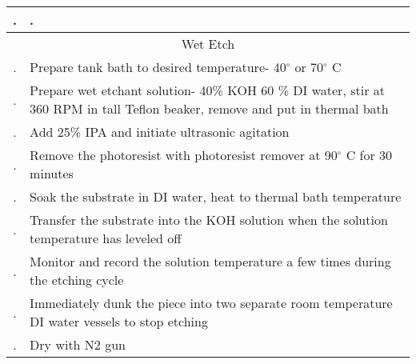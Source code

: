 \begin{longtable}{cp{15cm}}
	\midrule		
.&.\\	
	\midrule
	\multicolumn{2}{c}{Wet Etch} \\
	\midrule		
.&Prepare tank bath to desired temperature-  40$^{\circ}$ or 70$^{\circ}$ C  \\
.&Prepare wet etchant solution- 40\% KOH 60 \% DI water, stir at 360 RPM in tall Teflon beaker, remove and put in thermal bath  \\
.&Add 25\% IPA and initiate ultrasonic agitation \\
.&Remove the photoresist with photoresist remover at 90$^{\circ}$ C for 30 minutes  \\
.&Soak the substrate in DI water, heat to thermal bath temperature  \\
.&Transfer the substrate into the KOH solution when the solution temperature has leveled off \\
.&Monitor and record the solution temperature a few times during the etching cycle  \\
.&Immediately dunk the piece into two separate room temperature DI water vessels to stop etching  \\
.&Dry with N2 gun\\
	\bottomrule
\end{longtable}	
